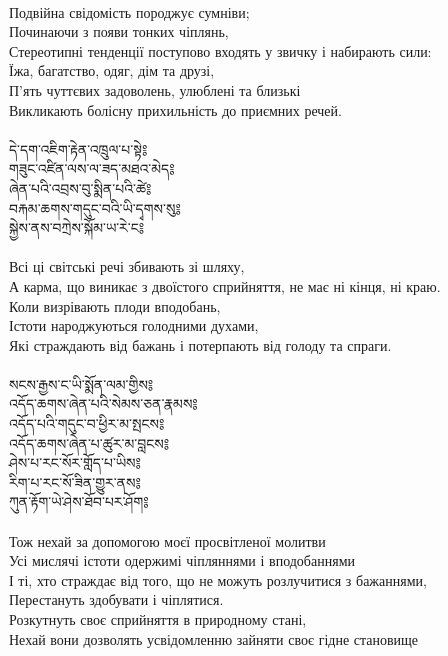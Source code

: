 \\
Подвійна свідомість породжує сумніви; \\
Починаючи з появи тонких чіплянь, \\
Стереотипні тенденції поступово входять у звичку і набирають сили: \\
Їжа, багатство, одяг, дім та друзі, \\
П'ять чуттєвих задоволень, улюблені та близькі \\
Викликають болісну прихильність до приємних речей. \\
\\
\newpage
{\ti
དེ་དག་འཇིག་རྟེན་འཁྲུལ་པ་སྟེ༔ \\
གཟུང་འཛིན་ལས་ལ་ཟད་མཐའ་མེད༔ \\
ཞེན་པའི་འབྲས་བུ་སྨིན་པའི་ཚེ༔ \\
བརྐམ་ཆགས་གདུང་བའི་ཡི་དྭགས་སུ༔ \\
སྐྱེས་ནས་བཀྲེས་སྐོམ་ཡ་རེ་ང༔}\\
\\
Всі ці світські речі збивають зі шляху, \\
А карма, що виникає з двоїстого сприйняття, не має ні кінця, ні краю. \\
Коли визрівають плоди вподобань, \\
Істоти народжуються голодними духами, \\
Які страждають від бажань і потерпають від голоду та спраги. \\
\\
{\ti
སངས་རྒྱས་ང་ཡི་སྨོན་ལམ་གྱིས༔ \\
འདོད་ཆགས་ཞེན་པའི་སེམས་ཅན་རྣམས༔ \\
འདོད་པའི་གདུང་བ་ཕྱིར་མ་སྤངས༔ \\
འདོད་ཆགས་ཞེན་པ་ཚུར་མ་བླངས༔ \\
ཤེས་པ་རང་སོར་གློད་པ་ཡིས༔ \\
རིག་པ་རང་སོ་ཟིན་གྱུར་ནས༔ \\
ཀུན་རྟོག་ཡེ་ཤེས་ཐོབ་པར་ཤོག༔}\\
\\
Тож нехай за допомогою моєї просвітленої молитви \\
Усі мислячі істоти одержимі чіпляннями і вподобаннями \\
І ті, хто страждає від того, що не можуть розлучитися з бажаннями, \\
Перестануть здобувати і чіплятися. \\
Розкутнуть своє сприйняття в природному стані, \\
Нехай вони дозволять усвідомленню зайняти своє гідне становище \\
